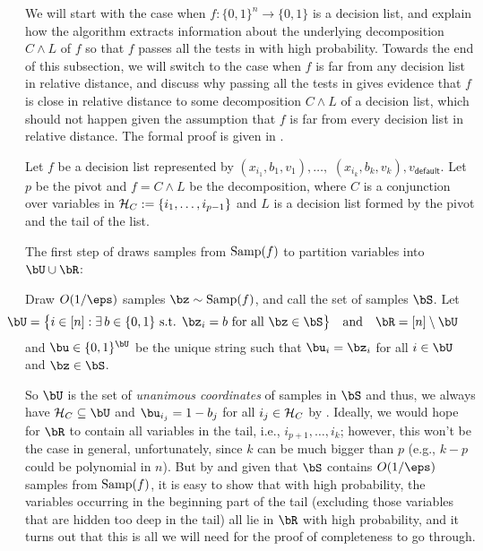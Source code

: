 \documentclass[11pt]{article}
\theoremstyle{definition}
\begin{document}
We will start with the case when $f:\{0,1\}^n\rightarrow \{0,1\}$ is a decision list, and explain how the algorithm 
  extracts information about the underlying decomposition
  $C\land L$ of $f$ so that $f$ passes all the tests in
   with high probability.
Towards the end of this subsection, we will switch to 
  the case when $f$ is far from any decision list in relative distance, and discuss why passing all the tests 
  in  gives evidence that 
  $f$ is close in relative distance to some decomposition
  $C\land L$ of a decision list, which should not happen given the assumption that $f$ is far from every decision list in relative distance.
The formal proof is given in .

  \medskip
Let $f$ be a decision list represented by 
  $(x_{i_1},b_{1},v_1),\ldots,$ $(x_{i_k},b_k,v_k),v_{\textsf{default}}$.
Let $p$ be the pivot and $f=C\land L$ be the decomposition,
  where $C$ is a conjunction over variables in ${\cal H}_C:=\{i_1,\ldots,i_{p-1}\}$ and 
  $L$ is a decision list formed by the pivot and the tail of the list.






The first step of  draws samples from $\mathrm{Samp}(f)$ to partition variables into $\bU\cup \bR$:\medskip





\begin{algorithm}[H]\begin{algorithmic}[1] \vspace{0.2cm}
    \setcounter{ALG@line}{1}
            \State Draw $O(1/\eps)$ samples $\bz \sim \SAMP(f)$, and call the set of samples $\bS$. Let 
    $$\hspace{-1cm}\bU=\big\{i\in [n]  : \exists \, b\in \{0,1\} \text{ s.t. } \bz_i = b \ \text{for all $\bz \in \bS$} \big\} \quad\text{and}\quad
    \bR=[n] \setminus \bU$$ 
 and $\bu \in \{0,1\}^{\bU}$ be the unique string such that $\bu_i=\bz_i$ for all $i\in \bU$ and $\bz \in \bS$.\vspace{0.15cm}  
    \end{algorithmic}
\end{algorithm}\medskip

\noindent So $\bU$ is the set of \emph{unanimous coordinates} of 
  samples in $\bS$ and thus, we always have ${\cal H}_C\subseteq \bU$ and $\bu_{i_j}=1-b_j$ for all $i_j\in {\cal H}_C$
  by . 
Ideally, we would hope for $\bR$ to contain all variables in the tail, i.e., $i_{p+1},\ldots,i_k$; however, this won't be the case in general, unfortunately, since $k$ can be much bigger than $p$ (e.g., $k-p$ could be polynomial in $n$). But by  and given that $\bS$ contains $O(1/\eps)$ samples from $\mathrm{Samp}(f)$, it is easy to show that with high probability, the variables occurring in the beginning part of the tail (excluding those variables that are hidden too deep in the tail) all lie in $\bR$ with high probability, and it turns out that this is all we will need for the proof of completeness to go through.
\end{document}
